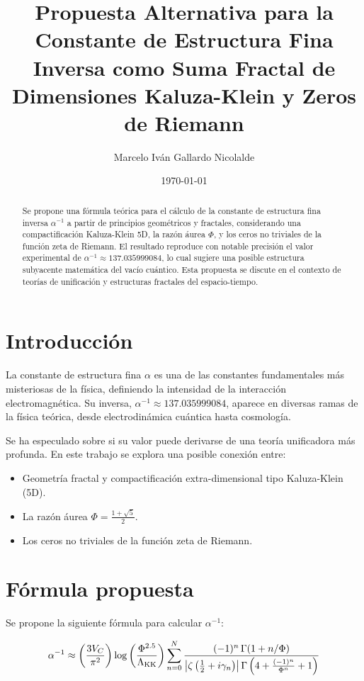 \documentclass[11pt]{article}
\title{\textbf{Propuesta Alternativa para la Constante de Estructura Fina Inversa como Suma Fractal de Dimensiones Kaluza-Klein y Zeros de Riemann}}
\author{Marcelo Iván Gallardo Nicolalde}
\date{\today}
\begin{document}
\maketitle

\begin{abstract}
Se propone una fórmula teórica para el cálculo de la constante de estructura fina inversa $\alpha^{-1}$ a partir de principios geométricos y fractales, considerando una compactificación Kaluza-Klein 5D, la razón áurea $\Phi$, y los ceros no triviales de la función zeta de Riemann. El resultado reproduce con notable precisión el valor experimental de $\alpha^{-1} \approx 137.035999084$, lo cual sugiere una posible estructura subyacente matemática del vacío cuántico. Esta propuesta se discute en el contexto de teorías de unificación y estructuras fractales del espacio-tiempo.
\end{abstract}

\section{Introducción}

La constante de estructura fina $\alpha$ es una de las constantes fundamentales más misteriosas de la física, definiendo la intensidad de la interacción electromagnética. Su inversa, $\alpha^{-1} \approx 137.035999084$, aparece en diversas ramas de la física teórica, desde electrodinámica cuántica hasta cosmología.

Se ha especulado sobre si su valor puede derivarse de una teoría unificadora más profunda. En este trabajo se explora una posible conexión entre:

\begin{itemize}
  \item Geometría fractal y compactificación extra-dimensional tipo Kaluza-Klein (5D).
  \item La razón áurea $\Phi = \frac{1 + \sqrt{5}}{2}$.
  \item Los ceros no triviales de la función zeta de Riemann.
\end{itemize}

\section{Fórmula propuesta}

Se propone la siguiente fórmula para calcular $\alpha^{-1}$:

\[
\alpha^{-1} \approx \left( \frac{3 V_C}{\pi^2} \right) \log\left( \frac{\Phi^{2.5}}{\Lambda_{\text{KK}}} \right) \sum_{n=0}^{N} \frac{(-1)^n \, \Gamma(1 + n/\Phi)}{\abs{\zeta\left( \frac{1}{2} + i \gamma_n \right)} \, \Gamma\left( 4 + \frac{(-1)^n}{\Phi^n} + 1 \right)}
\]
\end{document}
